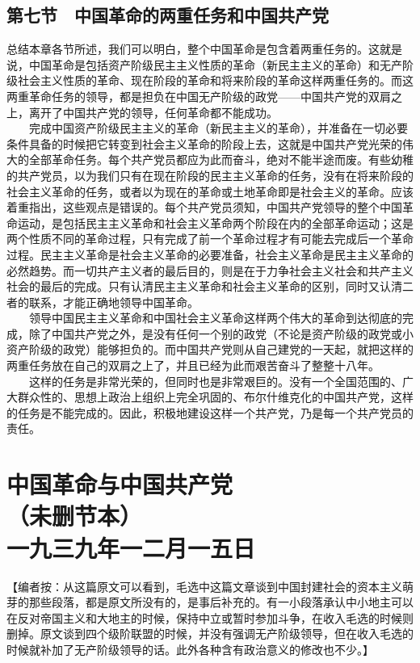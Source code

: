\documentclass[cn,11pt,chinese]{elegantbook}
\def\myformat#1{\hfil\hfil #1}
\begin{document}
\subsection*{\myformat{第七节　中国革命的两重任务和中国共产党}}
总结本章各节所述，我们可以明白，整个中国革命是包含着两重任务的。这就是说，中国革命是包括资产阶级民主主义性质的革命（新民主主义的革命）和无产阶级社会主义性质的革命、现在阶段的革命和将来阶段的革命这样两重任务的。而这两重革命任务的领导，都是担负在中国无产阶级的政党——中国共产党的双肩之上，离开了中国共产党的领导，任何革命都不能成功。\\
　　完成中国资产阶级民主主义的革命（新民主主义的革命），并准备在一切必要条件具备的时候把它转变到社会主义革命的阶段上去，这就是中国共产党光荣的伟大的全部革命任务。每个共产党员都应为此而奋斗，绝对不能半途而废。有些幼稚的共产党员，以为我们只有在现在阶段的民主主义革命的任务，没有在将来阶段的社会主义革命的任务，或者以为现在的革命或土地革命即是社会主义的革命。应该着重指出，这些观点是错误的。每个共产党员须知，中国共产党领导的整个中国革命运动，是包括民主主义革命和社会主义革命两个阶段在内的全部革命运动；这是两个性质不同的革命过程，只有完成了前一个革命过程才有可能去完成后一个革命过程。民主主义革命是社会主义革命的必要准备，社会主义革命是民主主义革命的必然趋势。而一切共产主义者的最后目的，则是在于力争社会主义社会和共产主义社会的最后的完成。只有认清民主主义革命和社会主义革命的区别，同时又认清二者的联系，才能正确地领导中国革命。\\
　　领导中国民主主义革命和中国社会主义革命这样两个伟大的革命到达彻底的完成，除了中国共产党之外，是没有任何一个别的政党（不论是资产阶级的政党或小资产阶级的政党）能够担负的。而中国共产党则从自己建党的一天起，就把这样的两重任务放在自己的双肩之上了，并且已经为此而艰苦奋斗了整整十八年。\\
　　这样的任务是非常光荣的，但同时也是非常艰巨的。没有一个全国范围的、广大群众性的、思想上政治上组织上完全巩固的、布尔什维克化的中国共产党，这样的任务是不能完成的。因此，积极地建设这样一个共产党，乃是每一个共产党员的责任。\\
\newpage\section*{\myformat{中国革命与中国共产党}\\\myformat{（未删节本）}\\\myformat{一九三九年一二月一五日}}

【编者按：从这篇原文可以看到，毛选中这篇文章谈到中国封建社会的资本主义萌芽的那些段落，都是原文所没有的，是事后补充的。有一小段落承认中小地主可以在反对帝国主义和大地主的时候，保持中立或暂时参加斗争，在收入毛选的时候则删掉。原文谈到四个级阶联盟的时候，并没有强调无产阶级领导，但在收入毛选的时候就补加了无产阶级领导的话。此外各种含有政治意义的修改也不少。】\\
\end{document}
